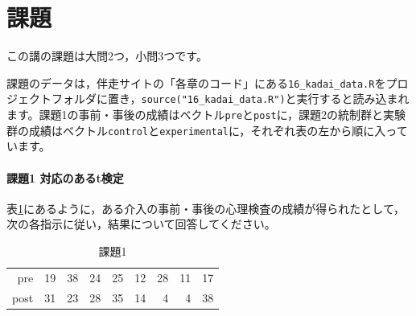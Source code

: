 \documentclass{ltjsbook}
\begin{document}
\section{課題}
この講の課題は大問2つ，小問3つです。

課題のデータは，伴走サイトの「各章のコード」にある\texttt{16\_kadai\_data.R}をプロジェクトフォルダに置き，\verb|source("16_kadai_data.R")|と実行すると読み込まれます。課題1の事前・事後の成績はベクトル\verb|pre|と\verb|post|に，課題2の統制群と実験群の成績はベクトル\verb|control|と\verb|experimental|に，それぞれ表の左から順に入っています。

\paragraph{課題1 対応のあるt検定}
表\ref{exe:16_2}にあるように，ある介入の事前・事後の心理検査の成績が得られたとして，次の各指示に従い，結果について回答してください。
\begin{table}[ht]
	\centering
	\caption{課題1}
	\label{exe:16_2}
	\begin{tabular}{rrrrrrrrr}
		\hline
		pre  & 19 & 38 & 24 & 25 & 12 & 28 & 11 & 17 \\
		post & 31 & 23 & 28 & 35 & 14 & 4  & 4  & 38 \\
		\hline
	\end{tabular}
\end{table}
\end{document}
